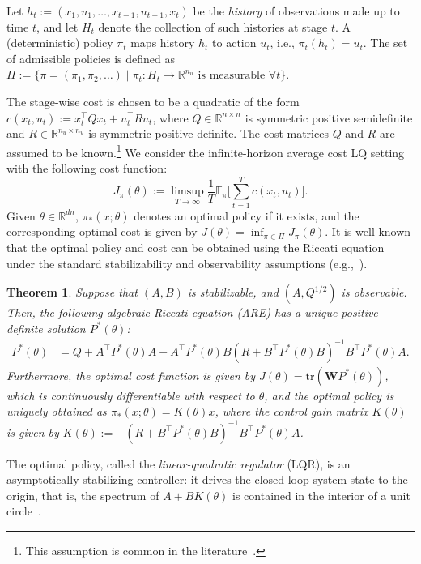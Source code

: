 \documentclass[11pt]{article}
\theoremstyle{plain}
\newtheorem{thm}{Theorem}[section]
\theoremstyle{definition}
\theoremstyle{remark}
\begin{document}
Let $h_t := (x_1, u_1, \ldots, x_{t-1}, u_{t-1}, x_t)$ be the \emph{history} of observations made up to time $t$, and let $H_t$ denote the collection of such histories at stage $t$. 
A (deterministic) policy $\pi_t$ maps history $h_t$ to action $u_t$, i.e., $\pi_t (h_t) = u_t$. The set of admissible policies is defined as 
$\Pi := \{\pi = (\pi_1, \pi_2, \ldots) \mid \pi_t: H_t \to \mathbb{R}^{n_u} \mbox{ is measurable $\forall t$} \}.$


The stage-wise cost is chosen to be a quadratic of the form
$c (x_t, u_t) := x_t^\top Q x_t + u_t^\top R u_t$,
where $Q \in \mathbb{R}^{n\times n}$ is symmetric positive semidefinite and $R \in \mathbb{R}^{n_u\times n_u}$ is symmetric positive definite. 
The cost matrices $Q$ and $R$ are assumed to be known.\footnote{This assumption is common in the literature~\cite{abbasi2011regret,faradonbeh2020adaptive,abeille2020efficient,jedra2022minimal,kargin2022thompson,dean2020sample}.}
We consider the infinite-horizon average cost LQ setting with the following cost function:
\begin{equation}
J_\pi (\theta) := \limsup_{T \to \infty} \frac{1}{T} \mathbb{E}_\pi \bigg [
\sum_{t=1}^T c (x_t, u_t)
\bigg ].
\end{equation}
Given $\theta \in \mathbb{R}^{d  n}$, $\pi_*(x;\theta)$ denotes an optimal policy  if it exists, and the corresponding optimal cost is given by
$J (\theta) = \inf_{\pi \in \Pi} J_\pi (\theta)$. 
It is well known that the optimal policy and cost can be obtained using the Riccati equation under the standard stabilizability and observability assumptions (e.g.,~\cite{bertsekas2011dynamic}). 

\begin{thm}\label{lqr}
Suppose that $(A, B)$ is stabilizable,
and $(A, Q^{1/2})$ is observable. 
Then, the following algebraic Riccati equation (ARE) has a unique positive definite solution $P^*(\theta)$:
\begin{equation}\label{ric}
\begin{split}
P^*(\theta) &= Q + A^\top P^*(\theta) A - A^\top P^*(\theta) B (R + B^\top P^*(\theta) B)^{-1} B^\top P^*(\theta) A.
\end{split}
\end{equation}
Furthermore, the optimal cost function is given by
$J (\theta) = \mathrm{tr} (\mathbf{W} P^*(\theta))$,
which is  continuously differentiable with respect to $\theta$,
and
the optimal policy is uniquely obtained as
$\pi_* (x; \theta) = K(\theta) x$,
where the control gain matrix $K(\theta)$ is given by $K(\theta) := - (R + B^\top P^*(\theta) B)^{-1} B^\top P^*(\theta) A$. 
\end{thm}
The optimal policy, called the \emph{linear-quadratic regulator} (LQR), is an asymptotically stabilizing controller: it drives the closed-loop system state to the origin, that is, the spectrum of $A + BK (\theta)$ is contained in the interior of a unit circle~\cite{bertsekas2011dynamic}. 
\end{document}
